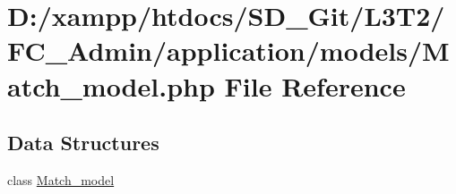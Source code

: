\hypertarget{_admin_2application_2models_2_match__model_8php}{}\section{D\+:/xampp/htdocs/\+S\+D\+\_\+\+Git/\+L3\+T2/\+F\+C\+\_\+\+Admin/application/models/\+Match\+\_\+model.php File Reference}
\label{_admin_2application_2models_2_match__model_8php}
\subsection*{Data Structures}
\begin{DoxyCompactItemize}
\item 
class \hyperlink{class_match__model}{Match\+\_\+model}
\end{DoxyCompactItemize}
